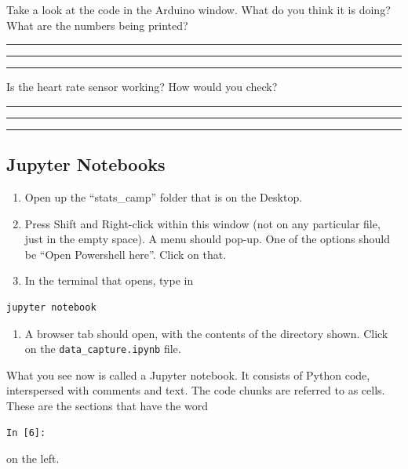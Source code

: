 \documentclass[11pt]{article}
\providecommand{\tightlist}{%
  \setlength{\itemsep}{0pt}\setlength{\parskip}{0pt}}
\begin{document}
\pagebreak

Take a look at the code in the Arduino window. What do you think it is
doing? What are the numbers being printed?

\vspace{1.5em}
\rule{16cm}{0.5pt}

\vspace{1.5em}
\rule{16cm}{0.5pt}

\vspace{1.5em}
\rule{16cm}{0.5pt}

Is the heart rate sensor working? How would you check?

\vspace{1.5em}
\rule{16cm}{0.5pt}

\vspace{1.5em}
\rule{16cm}{0.5pt}

\vspace{1.5em}
\rule{16cm}{0.5pt}

\hypertarget{jupyter-notebooks}{%
\subsection{Jupyter Notebooks}\label{jupyter-notebooks}}

\begin{enumerate}
\def\labelenumi{\arabic{enumi}.}
\tightlist
\item
  Open up the ``stats\_camp'' folder that is on the Desktop.
\item
  Press Shift and Right-click within this window (not on any particular file,
  just in the empty space). A menu should pop-up.  One of the options should be
  ``Open Powershell here''. Click on that.
\item
  In the terminal that opens, type in
\end{enumerate}
\begin{verbatim}
jupyter notebook
\end{verbatim}
\begin{enumerate}
\def\labelenumi{\arabic{enumi}.}
\setcounter{enumi}{3}
\tightlist
\item
  A browser tab should open, with the contents of the directory shown.
  Click on the \texttt{data\_capture.ipynb} file.
\end{enumerate}

What you see now is called a Jupyter notebook. It consists of Python
code, interspersed with comments and text. The code chunks are referred
to as cells. These are the sections that have the word 
\begin{verbatim}
In [6]: 
\end{verbatim}
on the left.
\end{document}
